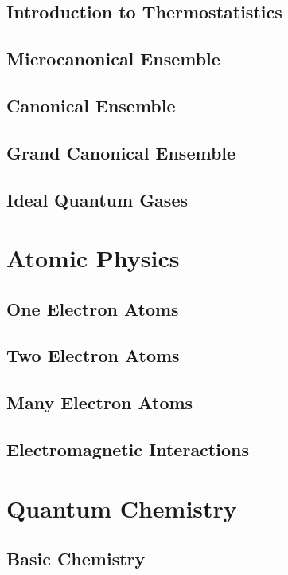 \documentclass[a4paper, 11pt]{book}
\newcommand{\1}{\opr{\mathds{1}}}
\begin{document}
	\chapter{Introduction to Thermostatistics}
		
	\chapter{Microcanonical Ensemble}
		
	\chapter{Canonical Ensemble}
		
	\chapter{Grand Canonical Ensemble}
		
	\chapter{Ideal Quantum Gases}
		
\part{Atomic Physics}
	\chapter{One Electron Atoms}
		
	\chapter{Two Electron Atoms}
		
	\chapter{Many Electron Atoms}
		
	\chapter{Electromagnetic Interactions}
		
\part{Quantum Chemistry}
	\chapter{Basic Chemistry}
		
\end{document}
